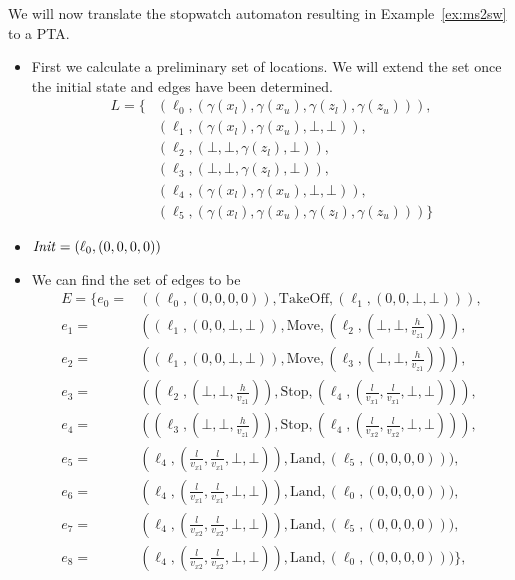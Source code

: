 \begin{ex}
We will now translate the stopwatch automaton resulting in Example~\ref{ex:ms2sw} to a PTA.
\begin{itemize}
    \item First we calculate a preliminary set of locations. We will extend the set once the initial state and edges have been determined.
    \begin{align*}
    L=\{&(\ell_{0},(\gamma(x_{l}),\gamma(x_{u}),\gamma(z_{l}),\gamma(z_{u}))), \\
        &(\ell_{1},(\gamma(x_{l}),\gamma(x_{u}),\bot,\bot)), \\
        &(\ell_{2},(\bot,\bot,\gamma(z_{l}),\bot)), \\
        &(\ell_{3},(\bot,\bot,\gamma(z_{l}),\bot)), \\
        &(\ell_{4},(\gamma(x_{l}),\gamma(x_{u}),\bot,\bot)), \\
        &(\ell_{5},(\gamma(x_{l}),\gamma(x_{u}),\gamma(z_{l}),\gamma(z_{u})))\}
    \end{align*}
    \item $\mathit{Init}=(\ell_{0},(0,0,0,0))$
    \item We can find the set of edges to be
    \begin{align*}
    E=\{e_{0}=&((\ell_{0},(0,0,0,0)),\text{TakeOff},(\ell_{1},(0,0,\bot,\bot))), \\
        e_{1}=&((\ell_{1},(0,0,\bot,\bot)),\text{Move},(\ell_{2},(\bot,\bot,\frac{h}{v_{z1}}))),\\
        e_{2}=&((\ell_{1},(0,0,\bot,\bot)),\text{Move},(\ell_{3},(\bot,\bot,\frac{h}{v_{z1}}))),\\
        e_{3}=&((\ell_{2},(\bot,\bot,\frac{h}{v_{z1}})),\text{Stop},(\ell_{4},(\frac{l}{v_{x1}},\frac{l}{v_{x1}},\bot,\bot))),\\
        e_{4}=&((\ell_{3},(\bot,\bot,\frac{h}{v_{z1}})),\text{Stop},(\ell_{4},(\frac{l}{v_{x2}},\frac{l}{v_{x2}},\bot,\bot))),\\
        e_{5}=&(\ell_{4},(\frac{l}{v_{x1}},\frac{l}{v_{x1}},\bot,\bot)),\text{Land},(\ell_{5},(0,0,0,0))),\\
        e_{6}=&(\ell_{4},(\frac{l}{v_{x1}},\frac{l}{v_{x1}},\bot,\bot)),\text{Land},(\ell_{0},(0,0,0,0))),\\
        e_{7}=&(\ell_{4},(\frac{l}{v_{x2}},\frac{l}{v_{x2}},\bot,\bot)),\text{Land},(\ell_{5},(0,0,0,0))),\\
        e_{8}=&(\ell_{4},(\frac{l}{v_{x2}},\frac{l}{v_{x2}},\bot,\bot)),\text{Land},(\ell_{0},(0,0,0,0)))\},

\end{align*}
\end{itemize}
\end{ex}
